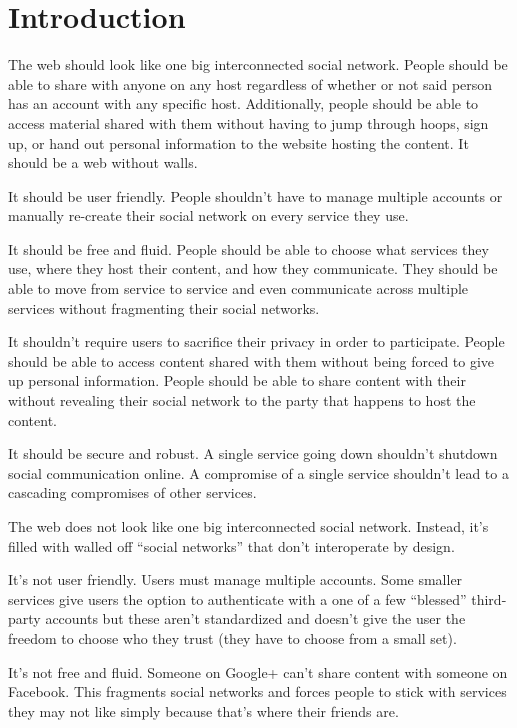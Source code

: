 \documentclass[pdftex,12pt,a4papaer,twoside,notitlepage]{report}
\begin{document}
\restoregeometry

\cleardoublepage

\tableofcontents

\cleardoublepage

\chapter{Introduction} 

The web should look like one big interconnected social network. People should be
able to share with anyone on any host regardless of whether or not said person
has an account with any specific host. Additionally, people should be able to
access material shared with them without having to jump through hoops, sign up,
or hand out personal information to the website hosting the content. It should
be a web without walls.

It should be user friendly. People shouldn't have to manage multiple accounts or
manually re-create their social network on every service they use.

It should be free and fluid. People should be able to choose what services they
use, where they host their content, and how they communicate. They should be
able to move from service to service and even communicate across multiple
services without fragmenting their social networks.

It shouldn't require users to sacrifice their privacy in order to participate.
People should be able to access content shared with them without being forced to
give up personal information. People should be able to share content with their
without revealing their social network to the party that happens to host the
content.

It should be secure and robust. A single service going down shouldn't shutdown
social communication online. A compromise of a single service shouldn't lead to
a cascading compromises of other services.

The web does not look like one big interconnected social network. Instead, it's
filled with walled off ``social networks'' that don't interoperate by design.

It's not user friendly. Users must manage multiple accounts. Some smaller
services give users the option to authenticate with a one of a few ``blessed''
third-party accounts but these aren't standardized and doesn't give the user the
freedom to choose who they trust (they have to choose from a small set).

It's not free and fluid. Someone on Google+ can't share content with someone on
Facebook. This fragments social networks and forces people to stick with
services they may not like simply because that's where their friends are.
\end{document}

